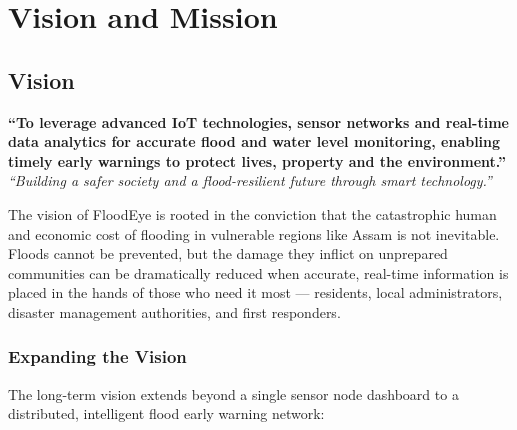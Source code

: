 ﻿%
\chapter{Vision and Mission}

\section{Vision}

\begin{center}
\colorbox{FloodLight}{%
  \parbox{0.88\linewidth}{%
    \vspace{6pt}
    \centering
    {\large\bfseries\color{FloodBlue} ``To leverage advanced IoT technologies, sensor networks and real-time data analytics for accurate flood and water level monitoring, enabling timely early warnings to protect lives, property and the environment.''}\\[4pt]
    {\normalsize\color{FloodGray}\textit{``Building a safer society and a flood-resilient future through smart technology.''}}
    \vspace{6pt}
  }%
}
\end{center}

\vspace{0.5cm}

The vision of FloodEye is rooted in the conviction that the catastrophic human and economic cost of flooding in vulnerable regions like Assam is not inevitable. Floods cannot be prevented, but the damage they inflict on unprepared communities can be dramatically reduced when accurate, real-time information is placed in the hands of those who need it most — residents, local administrators, disaster management authorities, and first responders.

\subsection{Expanding the Vision}

The long-term vision extends beyond a single sensor node dashboard to a distributed, intelligent flood early warning network:

